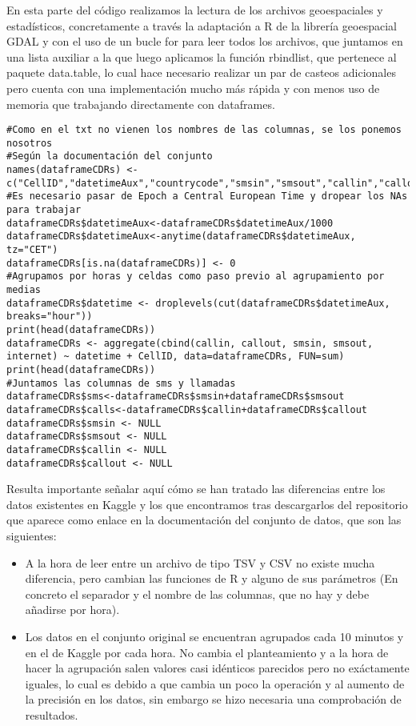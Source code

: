 \documentclass[11pt, a4paper]{article} %
\begin{document}
En esta parte del código realizamos la lectura de los archivos geoespaciales y estadísticos, concretamente a través la adaptación a R de la librería geoespacial GDAL y con el uso de un bucle for para leer todos los archivos, que juntamos en una lista auxiliar a la que luego aplicamos la función rbindlist, que pertenece al paquete data.table, lo cual hace necesario realizar un par de casteos adicionales pero cuenta con una implementación mucho más rápida y con menos uso de memoria que trabajando directamente con dataframes.
\begin{lstlisting}
#Como en el txt no vienen los nombres de las columnas, se los ponemos nosotros
#Según la documentación del conjunto
names(dataframeCDRs) <- c("CellID","datetimeAux","countrycode","smsin","smsout","callin","callout","internet")
#Es necesario pasar de Epoch a Central European Time y dropear los NAs para trabajar
dataframeCDRs$datetimeAux<-dataframeCDRs$datetimeAux/1000
dataframeCDRs$datetimeAux<-anytime(dataframeCDRs$datetimeAux, tz="CET")
dataframeCDRs[is.na(dataframeCDRs)] <- 0
#Agrupamos por horas y celdas como paso previo al agrupamiento por medias
dataframeCDRs$datetime <- droplevels(cut(dataframeCDRs$datetimeAux, breaks="hour"))
print(head(dataframeCDRs))
dataframeCDRs <- aggregate(cbind(callin, callout, smsin, smsout, internet) ~ datetime + CellID, data=dataframeCDRs, FUN=sum)
print(head(dataframeCDRs))
#Juntamos las columnas de sms y llamadas
dataframeCDRs$sms<-dataframeCDRs$smsin+dataframeCDRs$smsout
dataframeCDRs$calls<-dataframeCDRs$callin+dataframeCDRs$callout
dataframeCDRs$smsin <- NULL
dataframeCDRs$smsout <- NULL
dataframeCDRs$callin <- NULL
dataframeCDRs$callout <- NULL
\end{lstlisting}
Resulta importante señalar aquí cómo se han tratado las diferencias entre los datos existentes en Kaggle y los que encontramos tras descargarlos del repositorio que aparece como enlace en la documentación del conjunto de datos, que son las siguientes:
\begin{itemize}
\item A la hora de leer entre un archivo de tipo TSV y CSV no existe mucha diferencia, pero cambian las funciones de R y alguno de sus parámetros (En concreto el separador y el nombre de las columnas, que no hay y debe añadirse por hora).
\item Los datos en el conjunto original se encuentran agrupados cada 10 minutos y en el de Kaggle por cada hora. No cambia el planteamiento y a la hora de hacer la agrupación salen valores casi idénticos parecidos pero no exáctamente iguales, lo cual es debido a que cambia un poco la operación y al aumento de la precisión en los datos, sin embargo se hizo necesaria una comprobación de resultados.
\end{itemize}
\end{document}

